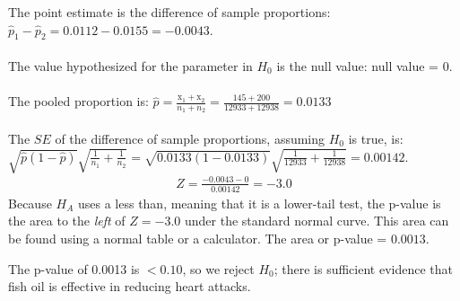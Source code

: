 \begin{examplewrap}
\begin{nexample}
\begin{description}
The point estimate is the difference of sample proportions: $\hat{p}_1-\hat{p}_2 = 0.0112 - 0.0155 = -0.0043.$\\
\\
The value hypothesized for the parameter in $H_0$ is the null value:  null value = 0.\\
\\
The pooled proportion is: $\hat{p} = \frac{\text{x}_1+\text{x}_2}{n_1+n_2}=\frac{145 + 200}{12933 + 12938}=0.0133$
\\
\\
The $SE$ of the difference of sample proportions, assuming $H_0$ is true, is:  $\sqrt{\hat{p}(1-\hat{p})}\sqrt{\frac{1}{n_1} + \frac{1}{n_2}} = \sqrt{0.0133(1-0.0133)}\sqrt{\frac{1}{12933} + \frac{1}{12938}}=0.00142$. \\
\begin{align*}
Z = \frac{-0.0043 - 0}{0.00142} = -3.0
\end{align*}
Because $H_A$ uses a less than, meaning that it is a lower-tail test, the \mbox{p-value} is the area to the \emph{left} of $Z=-3.0$ under the standard normal curve.  This area can be found using a normal table or a calculator.  The area or p-value = $0.0013$.  
\item[\inferencestep{Conclude}]  The p-value of 0.0013 is $< 0.10$, so we reject $H_0$; there is sufficient evidence that fish oil is effective in reducing heart attacks.  
\end{description}
\end{nexample}
\end{examplewrap}


